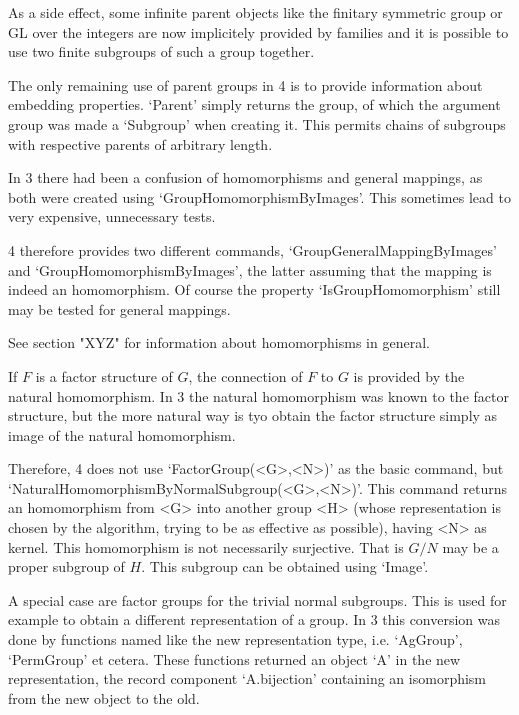 As a side effect, some infinite parent objects like the finitary symmetric
group or GL over the integers are now implicitely provided by families and
it is possible to use two finite subgroups of such a group together.

The only remaining use of parent groups in {\GAP}4 is to provide information
about embedding properties. `Parent' simply returns the group, of which the
argument group was made a `Subgroup' when creating it.
This permits chains of subgroups with respective parents of arbitrary length.


In {\GAP}3 there had been a confusion of homomorphisms and general mappings,
as both were created using `GroupHomomorphismByImages'. This sometimes lead
to very expensive, unnecessary tests.

{\GAP}4 therefore provides two different commands,
`GroupGeneralMappingByImages' and `GroupHomomorphismByImages', the latter
assuming that the mapping is indeed an homomorphism. Of course the property
`IsGroupHomomorphism' still may be tested for general mappings.

See section "XYZ" for information about homomorphisms in general.

If $F$ is a factor structure of $G$, the connection of $F$ to $G$ is
provided by the natural homomorphism. In {\GAP}3 the natural homomorphism
was known to the factor structure, but the more natural way is tyo obtain
the factor structure simply as image of the natural homomorphism.

Therefore, {\GAP}4 does not use `FactorGroup(<G>,<N>)' as the basic command,
but `NaturalHomomorphismByNormalSubgroup(<G>,<N>)'. This command returns an
homomorphism from <G> into another group <H> (whose representation is
chosen by the algorithm, trying to be as effective as possible), having
<N> as kernel. This homomorphism is not necessarily surjective. That is
$G/N$ may be a proper subgroup of $H$. This subgroup can be obtained using
`Image'.

A special case are factor groups for the trivial normal subgroups. This is
used for example to obtain a different representation of a group.
In {\GAP}3 this conversion was done by functions named like the new
representation type, i.e. `AgGroup', `PermGroup' et cetera. These functions
returned an object `A' in the new representation, the record component
`A.bijection' containing an isomorphism from the new object to the old.

